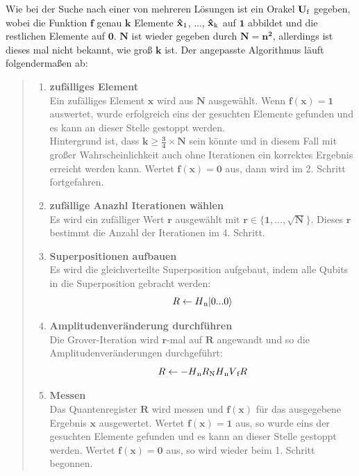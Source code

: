Wie bei der Suche nach einer von mehreren Lösungen ist ein Orakel $\mathbf{U \textsubscript{f}}$ gegeben, wobei die Funktion $\mathbf{f}$ genau $\mathbf{k}$ Elemente $\mathbf{\hat x \textsubscript{1}}$, ..., $\mathbf{\hat x \textsubscript{k}}$ auf $\mathbf{1}$ abbildet und die restlichen Elemente auf $\mathbf{0}$. $\mathbf{N}$ ist wieder gegeben durch $\mathbf{N = n^2}$, allerdings ist dieses mal nicht bekannt, wie groß $\mathbf{k}$ ist. Der angepasste Algorithmus läuft folgendermaßen ab:
\begin{quote}
    \begin{enumerate}
        \item \textbf{zufälliges Element}
        \\
        Ein zufälliges Element $\mathbf{x}$ wird aus $\mathbf{N}$ ausgewählt. Wenn $\mathbf{f(x) = 1}$ auswertet, wurde erfolgreich eins der gesuchten Elemente gefunden und es kann an dieser Stelle gestoppt werden. 
        \\
        Hintergrund ist, dass $\mathbf{k \geq \frac{3}{4} \times N}$ sein könnte und in diesem Fall mit großer Wahrscheinlichkeit auch ohne Iterationen ein korrektes Ergebnis erreicht werden kann. Wertet $\mathbf{f(x) = 0}$ aus, dann wird im 2. Schritt fortgefahren.
        \item \textbf{zufällige Anazhl Iterationen wählen}
        \\
        Es wird ein zufälliger Wert $\mathbf{r}$ ausgewählt mit $\mathbf{r \in \{ 1, ..., \sqrt{N} \}}$. Dieses $\mathbf{r}$ bestimmt die Anzahl der Iterationen im 4. Schritt.
        \item \textbf{Superpositionen aufbauen}
        \\
        Es wird die gleichverteilte Superposition aufgebaut, indem alle Qubits in die Superposition gebracht werden:
        \begin{equation}
            R \leftarrow H\textsubscript{n} |0 ... 0\rangle 
        \end{equation}
        \item \textbf{Amplitudenveränderung durchführen}
        \\
        Die Grover-Iteration wird $\mathbf{r}$-mal auf $\mathbf{R}$ angewandt und so die Amplitudenveränderungen durchgeführt:
        \begin{equation}
            R \leftarrow -H\textsubscript{n} R\textsubscript{N} H\textsubscript{n} V\textsubscript{f} R
        \end{equation}
        \item \textbf{Messen}
        \\
        Das Quantenregister $\mathbf{R}$ wird messen und $\mathbf{f(x)}$ für das ausgegebene Ergebnis $\mathbf{x}$ ausgewertet. Wertet $\mathbf{f(x) = 1}$ aus, so wurde eins der gesuchten Elemente gefunden und es kann an dieser Stelle gestoppt werden. Wertet $\mathbf{f(x) = 0}$ aus, so wird wieder beim 1. Schritt begonnen.
    \end{enumerate}
\end{quote}

